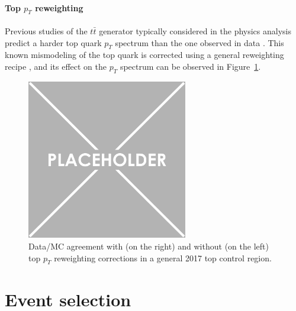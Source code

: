 \documentclass[a4paper, 10pt, openright]{report}
\begin{document}
\subsubsection{Top $p_T$ reweighting}

Previous studies of the $t \bar t$ generator typically considered in the physics analysis predict a harder top quark $p_T$ spectrum than the one observed in data \cite{topPt}. This known mismodeling of the top quark is corrected using a general reweighting recipe \cite{TopPtRecipe}, and its effect on the $p_T$ spectrum can be observed in Figure~\ref{fig:Toppt}.

\begin{figure}[htbp]
\begin{center}
\includegraphics[width=7cm, height=7cm]{figs/placeholder.png}
\caption{Data/\ac{MC} agreement with (on the right) and without (on the left) top $p_T$ reweighting corrections in a general 2017 top control region.}
\label{fig:Toppt}
\end{center}
\end{figure}































\chapter{Event selection} \label{chapter:Selection}
\end{document}
